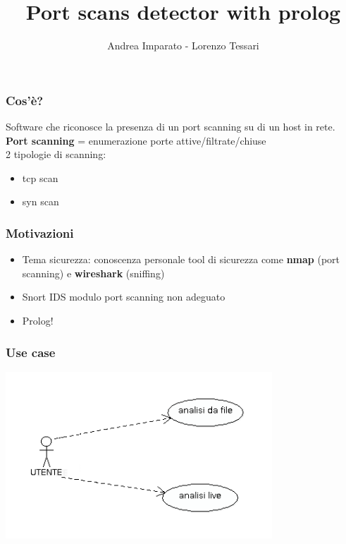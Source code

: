 \documentclass{beamer}
\title{Port scans detector with prolog}
\author{Andrea Imparato - Lorenzo Tessari}\institute{Unversit\`a degli studi di Padova}
\begin{document}
\begin{frame}
\titlepage
\end{frame}



\begin{frame}
\frametitle{Cos'\`e?}
Software che riconosce la presenza 
di un port scanning su di un host in rete.\\

\textbf{Port scanning} = enumerazione porte attive/filtrate/chiuse\\[2cm]

2 tipologie di scanning:

\begin{itemize}

\item tcp scan

\item syn scan


\end{itemize}




\end{frame}



\begin{frame}
\frametitle{Motivazioni}
\begin{itemize}[<+->]
\item Tema sicurezza: conoscenza personale tool di sicurezza come \textbf{nmap} (port scanning) e \textbf{wireshark} (sniffing)
\item Snort IDS modulo port scanning non adeguato
\item Prolog!
\end{itemize}
\end{frame}


\begin{frame}
\frametitle{Use case}
 \includegraphics[width=10cm]{usecase1.png}
\end{frame}
\end{document}
